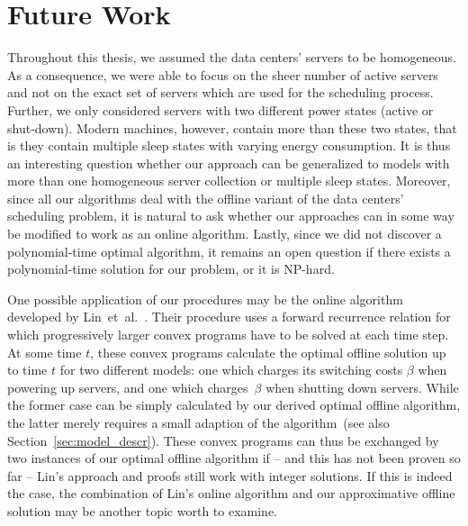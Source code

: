\section{Future Work}
Throughout this thesis, we assumed the data centers' servers to be homogeneous. As a consequence, we were able to focus on the sheer number of active servers and not on the exact set of servers which are used for the scheduling process. Further, we only considered servers with two different power states (active or shut-down). Modern machines, however, contain more than these two states, that is they contain multiple sleep states with varying energy consumption. It is thus an interesting question whether our approach can be generalized to models with more than one homogeneous server collection or multiple sleep states. 
Moreover, since all our algorithms deal with the offline variant of the data centers' scheduling problem, it is natural to ask whether our approaches can in some way be modified to work as an online algorithm. Lastly, since we did not discover a polynomial-time optimal algorithm, it remains an open question if there exists a polynomial-time solution for our problem, or it is NP-hard.

One possible application of our procedures may be the online algorithm developed by Lin~et~al.~\parencite{dyn-right-sizing}. Their procedure uses a forward recurrence relation for which progressively larger convex programs have to be solved at each time step. At some time $t$, these convex programs calculate the optimal offline solution up to time $t$ for two different models: one which charges its switching costs $\beta$ when powering up servers, and one which charges~$\beta$ when shutting down servers. While the former case can be simply calculated by our derived optimal offline algorithm, the latter merely requires a small adaption of the algorithm~(see also Section~\ref{sec:model_descr}). These convex programs can thus be exchanged by two instances of our optimal offline algorithm if -- and this has not been proven so far -- Lin's approach and proofs still work with integer solutions. If this is indeed the case, the combination of Lin's online algorithm and our approximative offline solution may be another topic worth to examine.
